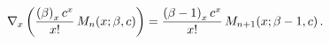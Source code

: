 \[\nabla_{x}\left(\frac{\left(\beta\right)_{x}c^{x}}{x!}\mathop{M_{n}\/}%
\nolimits\!\left(x;\beta,c\right)\right)=\frac{\left(\beta-1\right)_{x}c^{x}}{%
x!}\mathop{M_{n+1}\/}\nolimits\!\left(x;\beta-1,c\right).\]